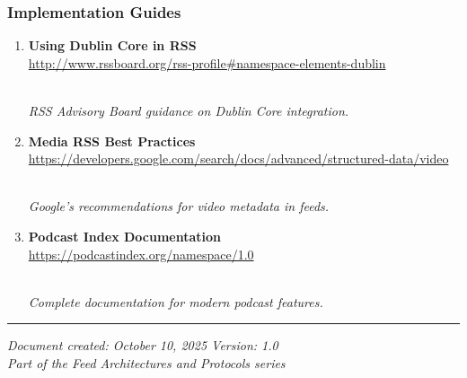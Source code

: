 \documentclass[
  letterpaper,
  DIV=11,
  numbers=noendperiod]{scrartcl}
\begin{document}
\subsubsection{Implementation Guides}\label{implementation-guides}

\begin{enumerate}
\def\labelenumi{\arabic{enumi}.}
\setcounter{enumi}{9}
\item
  \textbf{Using Dublin Core in RSS}\\
  \url{http://www.rssboard.org/rss-profile\#namespace-elements-dublin}\strut \\
  \emph{RSS Advisory Board guidance on Dublin Core integration.}
\item
  \textbf{Media RSS Best Practices}\\
  \url{https://developers.google.com/search/docs/advanced/structured-data/video}\strut \\
  \emph{Google's recommendations for video metadata in feeds.}
\item
  \textbf{Podcast Index Documentation}\\
  \url{https://podcastindex.org/namespace/1.0}\strut \\
  \emph{Complete documentation for modern podcast features.}
\end{enumerate}

\begin{center}\rule{0.5\linewidth}{0.5pt}\end{center}

\emph{Document created: October 10, 2025 \textbar{} Version: 1.0}\\
\emph{Part of the Feed Architectures and Protocols series}
\end{document}
